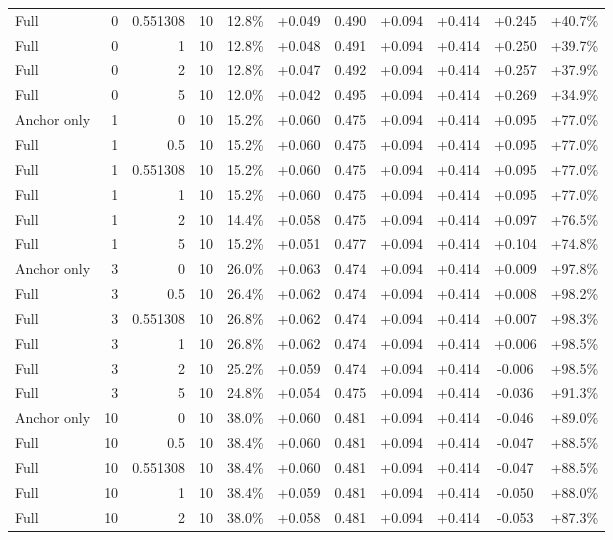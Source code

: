 \begin{table}[htbp]
\begin{tabular}{lrrrccccccc}
Full & 0 & 0.551308 & 10 & 12.8\% & +0.049 & 0.490 & +0.094 & +0.414 & +0.245 & +40.7\% \\
Full & 0 & 1 & 10 & 12.8\% & +0.048 & 0.491 & +0.094 & +0.414 & +0.250 & +39.7\% \\
Full & 0 & 2 & 10 & 12.8\% & +0.047 & 0.492 & +0.094 & +0.414 & +0.257 & +37.9\% \\
Full & 0 & 5 & 10 & 12.0\% & +0.042 & 0.495 & +0.094 & +0.414 & +0.269 & +34.9\% \\
Anchor only & 1 & 0 & 10 & 15.2\% & +0.060 & 0.475 & +0.094 & +0.414 & +0.095 & +77.0\% \\
Full & 1 & 0.5 & 10 & 15.2\% & +0.060 & 0.475 & +0.094 & +0.414 & +0.095 & +77.0\% \\
Full & 1 & 0.551308 & 10 & 15.2\% & +0.060 & 0.475 & +0.094 & +0.414 & +0.095 & +77.0\% \\
Full & 1 & 1 & 10 & 15.2\% & +0.060 & 0.475 & +0.094 & +0.414 & +0.095 & +77.0\% \\
Full & 1 & 2 & 10 & 14.4\% & +0.058 & 0.475 & +0.094 & +0.414 & +0.097 & +76.5\% \\
Full & 1 & 5 & 10 & 15.2\% & +0.051 & 0.477 & +0.094 & +0.414 & +0.104 & +74.8\% \\
Anchor only & 3 & 0 & 10 & 26.0\% & +0.063 & 0.474 & +0.094 & +0.414 & +0.009 & +97.8\% \\
Full & 3 & 0.5 & 10 & 26.4\% & +0.062 & 0.474 & +0.094 & +0.414 & +0.008 & +98.2\% \\
Full & 3 & 0.551308 & 10 & 26.8\% & +0.062 & 0.474 & +0.094 & +0.414 & +0.007 & +98.3\% \\
Full & 3 & 1 & 10 & 26.8\% & +0.062 & 0.474 & +0.094 & +0.414 & +0.006 & +98.5\% \\
Full & 3 & 2 & 10 & 25.2\% & +0.059 & 0.474 & +0.094 & +0.414 & -0.006 & +98.5\% \\
Full & 3 & 5 & 10 & 24.8\% & +0.054 & 0.475 & +0.094 & +0.414 & -0.036 & +91.3\% \\
Anchor only & 10 & 0 & 10 & 38.0\% & +0.060 & 0.481 & +0.094 & +0.414 & -0.046 & +89.0\% \\
Full & 10 & 0.5 & 10 & 38.4\% & +0.060 & 0.481 & +0.094 & +0.414 & -0.047 & +88.5\% \\
Full & 10 & 0.551308 & 10 & 38.4\% & +0.060 & 0.481 & +0.094 & +0.414 & -0.047 & +88.5\% \\
Full & 10 & 1 & 10 & 38.4\% & +0.059 & 0.481 & +0.094 & +0.414 & -0.050 & +88.0\% \\
Full & 10 & 2 & 10 & 38.0\% & +0.058 & 0.481 & +0.094 & +0.414 & -0.053 & +87.3\% \\

\end{tabular}
\end{table}
